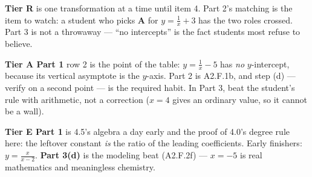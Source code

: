 \documentclass[10pt]{article}
\begin{document}
\begin{teachernote}
\textbf{Tier R} is one transformation at a time until item 4. Part 2's matching is the item to watch: a
student who picks \textbf{A} for $y=\frac1x+3$ has the two roles crossed. Part 3 is not a throwaway ---
``no intercepts'' is the fact students most refuse to believe.

\vspace{3pt}
\textbf{Tier A Part 1} row 2 is the point of the table: $y=\frac1x-5$ has \emph{no} $y$-intercept,
because its vertical asymptote is the $y$-axis. Part 2 is A2.F.1b, and step (d) --- verify on a second
point --- is the required habit. In Part 3, beat the student's rule with arithmetic, not a correction
($x=4$ gives an ordinary value, so it cannot be a wall).

\vspace{3pt}
\textbf{Tier E Part 1} is 4.5's algebra a day early and the proof of 4.0's degree rule here: the
leftover constant \emph{is} the ratio of the leading coefficients. Early finishers: $y=\frac{x}{x-2}$.
\textbf{Part 3(d)} is the modeling beat (A2.F.2f) --- $x=-5$ is real mathematics and meaningless
chemistry.
\end{teachernote}
\end{document}
